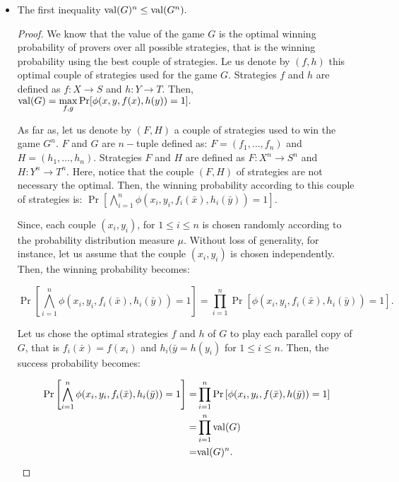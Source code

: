 \begin{itemize}
\item The first inequality $\mathrm{val} (G)^n \leq \mathrm{val} (G^n) .$

\begin{proof}
We know that the value of the game $G$ is the optimal winning probability of provers over all possible strategies, that is the winning probability using the best couple of strategies. Le us denote by $(f,h)$ this optimal couple of strategies used for the game $G$. Strategies $f$ and $h$ are  defined as $f: X\longrightarrow S$ and  $h: Y\longrightarrow T.$  Then, $\mathrm{val} (G)= \max\limits_{f,g} \Pr[\phi(x,y,f(x),h(y))=1].$

As far as, let us denote by $(F,H)$ a couple of strategies  used  to win the game $G^n$. $F$ and $G$ are $n-$tuple defined as: $F=(f_1, \ldots, f_n)$ and  $H=(h_1, \ldots, h_n)$. Strategies $F$ and $H$ are  defined as $F: X^n\longrightarrow S^n$ and  $H: Y^n\longrightarrow T^n.$ Here, notice that the couple $(F,H)$ of strategies are not necessary the optimal.
Then, the winning probability according to this couple of strategies is: $\Pr \left[\bigwedge\limits_{i=1}^n \phi (x_i,y_i, f_i(\bar{x}), h_i(\bar{y}))=1 \right].$

Since, each couple $(x_i,y_i)$, for $ 1\leq i \leq n$ is chosen randomly  according to the  probability distribution measure $\mu$. Without loss of generality, for instance, let us assume that the couple $(x_i,y_i)$ is chosen independently. Then, the winning probability becomes: 

$$\Pr \left[\bigwedge\limits_{i=1}^n \phi (x_i,y_i, f_i(\bar{x}), h_i(\bar{y}))=1 \right]= \prod\limits_{i=1}^n \Pr \left[ \phi (x_i,y_i, f_i(\bar{x}), h_i(\bar{y}))=1 \right].$$


Let us chose the optimal strategies $f$ and $h$ of $G$ to play each parallel copy of $G$, that is $f_i (\bar{x})=f(x_i)$ and $h_i (\bar{y}=h (y_i)$ for $ 1\leq i \leq n$. Then, the success probability becomes:

\begin{align*}
\Pr \left[\bigwedge\limits_{i=1}^n \phi (x_i,y_i, f_i(\bar{x}), h_i(\bar{y}))=1 \right] = &   \prod\limits_{i=1}^n \Pr \left[ \phi (x_i,y_i, f(\bar{x}), h(\bar{y}))=1 \right] \\
= & \prod\limits_{i=1}^n \mathrm{val} (G) \\
= & \mathrm{val} (G)^n.
\end{align*}


\end{proof}
\end{itemize}

